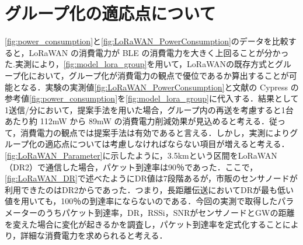\section{グループ化の適応点について}
\ref{fig:power_consumption}と\ref{fig:LoRaWAN_PowerConsumption}のデータを比較すると，LoRaWAN の消費電力が BLE の消費電力を大きく上回ることが分かった.実測により，\ref{fig:model_lora_group}を用いて，LoRaWANの既存方式とグループ化において，グループ化が消費電力の観点で優位であるか算出することが可能となる．実験の実測値\ref{fig:LoRaWAN_PowerConsumption}と文献の Cypress の参考値\ref{fig:power_consumption}を\ref{fig:model_lora_group}に代入する．結果として1送信/分において，提案手法を用いた場合，グループ内の再送を考慮すると1台あたり約 112mW から 89mW の消費電力削減効果が見込めると考える．従って，消費電力の観点では提案手法は有効であると言える．しかし，実測によりグループ化の適応点については考慮しなければならない項目が増えると考える．\ref{fig:LoRaWAN_Parameter}に示したように，3.5kmという区間をLoRaWAN（DR2）で通信した場合，パケット到達率は90％であった．ここで，\ref{fig:LoRaWAN_DR}で述べたようにDR値は7段階あるが，市販のセンサノードが利用できたのはDR2からであった．つまり，長距離伝送においてDRが最も低い値を用いても，100％の到達率にならないのである．今回の実測で取得したパラメーターのうちパケット到達率，DR，RSSi，SNRがセンサノードとGWの距離を変えた場合に変化が起きるかを調査し，パケット到達率を定式化することにより，詳細な消費電力を求められると考える．